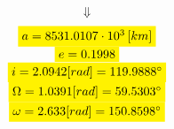 \documentclass[11pt, a4paper]{article}
\begin{document}
$$\Downarrow$$
\begin{equation}
\begin{matrix}
    \colorbox{yellow}{$a = 8531.0107\cdot10^3\left[km\right]$}\\
    \colorbox{yellow}{$e = 0.1998$}\\
    \colorbox{yellow}{$i = 2.0942[rad] = 119.9888^\circ$}\\
    \colorbox{yellow}{$\Omega = 1.0391 [rad] = 59.5303^\circ$}\\
    \colorbox{yellow}{$\omega = 2.633 [rad] = 150.8598^\circ$}
\end{matrix}
\end{equation}

\newpage


\end{document}
